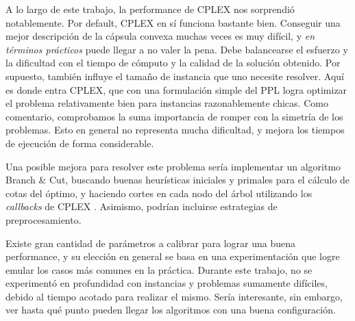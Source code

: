 A lo largo de este trabajo, la performance de CPLEX nos sorprendió notablemente. Por default, CPLEX en sí funciona bastante bien. Conseguir una mejor descripción de la cápsula convexa muchas veces es muy difícil, y \textit{en términos prácticos} puede llegar a no valer la pena. Debe balancearse el esfuerzo y la dificultad con el tiempo de cómputo y la calidad de la solución obtenido. Por supuesto, también influye el tamaño de instancia que uno necesite resolver. Aquí es donde entra CPLEX, que con una formulación simple del PPL logra optimizar el problema relativamente bien para instancias razonablemente chicas. Como comentario, comprobamos la suma importancia de romper con la simetría de los problemas. Esto en general no representa mucha dificultad, y mejora los tiempos de ejecución de forma considerable.

Una posible mejora para resolver este problema sería implementar un algoritmo Branch \& Cut, buscando buenas heurísticas iniciales y primales para el cálculo de cotas del óptimo, y haciendo cortes en cada nodo del árbol utilizando los \textit{callbacks} de CPLEX \cite{cplex}. Asimismo, podrían incluirse estrategias de preprocesamiento.

Existe gran cantidad de parámetros a calibrar para lograr una buena performance, y su elección en general se basa en una experimentación que logre emular los casos más comunes en la práctica. Durante este trabajo, no se experimentó en profundidad con instancias y problemas sumamente difíciles, debido al tiempo acotado para realizar el mismo. Sería interesante, sin embargo, ver hasta qué punto pueden llegar los algoritmos con una buena configuración.